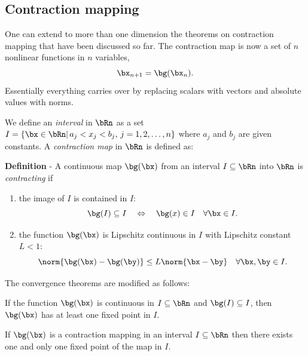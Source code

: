 \subsection{Contraction mapping}

One can extend to more than one dimension the theorems on contraction
mapping that have been discussed so far.  The contraction map is now a
set of $n$ nonlinear functions in $n$ variables,
%
\begin{equation*}
  \bx_{n+1} = \bg(\bx_n) .
\end{equation*}
%
Essentially everything carries over by replacing scalars with vectors
and absolute values with norms.

We define an \textit{interval} in $\bRn$ as a set $I = \{ \bx \in \bRn
| \, a_j < x_j < b_j, \, j=1,2,\ldots, n \}$ where $a_j$ and $b_j$ are
given constants.  A \textit{contraction map} in $\bRn$ is defined as:

\noindent
\textbf{Definition} - A continuous map $\bg(\bx)$ from an interval
$I \subseteq \bRn$ into $\bRn$ is \textit{contracting} if
%
\begin{enumerate}
\item the image of $I$ is contained in $I$:
  \begin{equation*}
    \bg(I) \subseteq I \quad \Leftrightarrow \quad
    \bg(x) \in I \quad \forall \bx \in I .
  \end{equation*}
\item the function $\bg(\bx)$ is Lipschitz continuous in $I$ with
  Lipschitz constant $L < 1$:
  \begin{equation*}
    \norm{ \bg(\bx) - \bg(\by) } \le L \norm{ \bx - \by } \quad
    \forall \bx,\by \in I .
  \end{equation*}
%
\end{enumerate}

The convergence theorems are modified as follows:

\smallskip

\begin{theorem}
\label{contract1Rn}
If the function $\bg(\bx)$ is continuous in $I \subseteq \bRn$ and
$\bg(I) \subseteq I$, then $\bg(\bx)$ has at least one fixed point in
$I$.
\end{theorem}

\begin{theorem}
\label{contract2Rn}
If $\bg(\bx)$ is a contraction mapping in an interval $I \subseteq
\bRn$ then there exists one and only one fixed point of the map in
$I$.
\end{theorem}

